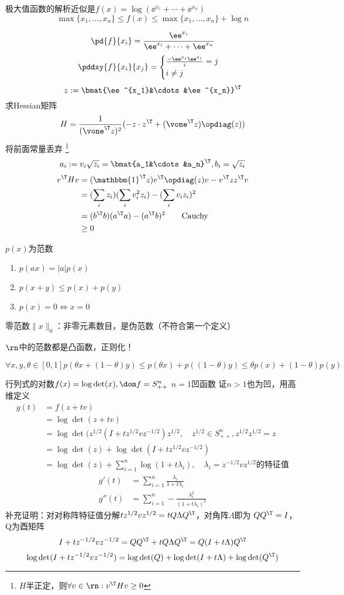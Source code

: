 \documentclass{note}
\begin{document}
极大值函数的解析近似是$f(x)=\log(\ee^{x_1}+\cdots+\ee^{x_n})$
\[\max\{x_1,\ldots,x_n\}\leq f(x)\leq\max\{x_1,\ldots,x_n\}+\log n\]
\begin{analysis}
\[\pd{f}{x_i}=\frac{\ee^{x_i}}{\ee^{x_i}+\cdots+\ee^{x_n}}\]
\[\pddxy{f}{x_i}{x_j}=\begin{cases}\frac{-\ee^{x_i}\ee^{x_i}}i=j\\i\ne j\end{cases}\]
\[z:=\bmat{\ee^{x_1}&\cdots&\ee^{x_n}}^\T\]
求Hessian矩阵
\[H=\frac{1}{(\vone^\T z)^2}(-z\cdot z^\T+(\vone^\T z)\opdiag(z))\]
将前面常量丢弃
\footnote{$H$半正定，则$\forall v\in\rn:v^\T Hv\geq 0$}
\[a_i:=v_i\sqrt{z_i}=\bmat{a_1&\cdots&a_n}^\T,b_i=\sqrt{z_i}\]
\[\begin{aligned}
v^\T Hv&=(\mathbbm{1}^\T z)v^\T \opdiag(z)v-v^\T zz^\T v\\
&=(\sum_i z_i)(\sum_i v_i^2 z_i)-(\sum_i v_i z_i)^2\\
&=(b^\T b)(a^\T a)-(a^\T b)^2\qquad\text{Cauchy}\\
&\geq 0
\end{aligned}\]
\end{analysis}

\begin{definition}[范数]
$p(x)$为范数
\begin{enumerate}
	\item $p(ax)=|a|p(x)$
	\item $p(x+y)\leq p(x)+p(y)$
	\item $p(x)=0\iff x=0$
\end{enumerate}
零范数$\|x\|_0$：非零元素数目，是伪范数（不符合第一个定义）
\end{definition}
$\rn$中的范数都是凸函数，正则化！
\begin{analysis}
\[\forall x,y,\theta\in[0,1]
p(\theta x+(1-\theta)y)\leq p(\theta x)+p((1-\theta)y)
\leq \theta p(x)+(1-\theta)p(y)\]
\end{analysis}

行列式的对数$f(x)=\log\det(x),\dom f=S_{++}^n$
$n=1$凹函数
证$n>1$也为凹，用高维定义
\[\begin{aligned}
g(t)&=f(z+tv)\\
&=\log\det(z+tv)\\
&=\log\det(z^{1/2}(I+tz^{1/2}vz^{-1/2})z^{1/2},\quad z^{1/2}\in S_{++}^n,z^{1/2}z^{1/2}=z\\
&=\log\det(z)+\log\det(I+tz^{1/2}vz^{-1/2})\\
&=\log\det(z)+\sum_{i=1}^n\log(1+t\lambda_i),\quad \lambda_i=z^{-1/2}vz^{1/2}\text{的特征值}
\end{aligned}\]
\[\begin{aligned}
g'(t)&=\sum_{i=1}^n\frac{\lambda_i}{1+t\lambda_i}\\
g''(t)&=\sum_{i=1}^n-\frac{\lambda_i^2}{(1+t\lambda_i)^2}
\end{aligned}\]
补充证明：对对称阵特征值分解$tz^{1/2}vz^{1/2}=tQ\Lambda Q^\T$，对角阵$\Lambda$即为
$QQ^\T=I$，Q为酉矩阵
\[I+tz^{-1/2}vz^{-1/2}=QQ^\T+tQ\Lambda Q^\T=Q(I+t\Lambda)Q^\T\]
\[\log\det(I+tz^{-1/2}vz^{-1/2})=\log\det(Q)+\log\det(I+t\Lambda)+\log\det(Q^\T)\]
\end{document}
